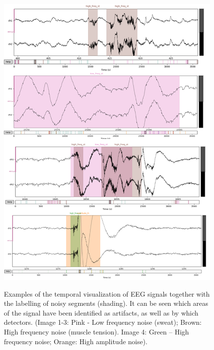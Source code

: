 \vspace{+0.9cm}
\begin{figure}[ht]
    \vskip -0.2in 
    \centering
    \caption[Examples of temporal visualization of EEG signals with labelling]{Examples of the temporal visualization of EEG signals together with the labelling of noisy segments (shading). It can be seen which areas of the signal have been identified as artifacts, as well as by which detectors. (Image 1-3: Pink - Low frequency noise (sweat); Brown: High frequency noise (muscle tension). Image 4: Green – High frequency noise; Orange: High amplitude noise).}
    \includegraphics[width=0.6\columnwidth]{fig_dataquality/bitbrain_eeg_and_noise_labels.PNG}
    \label{fig:bitbrain_eeg_noise}
    \vskip -0.0in 
\end{figure}

